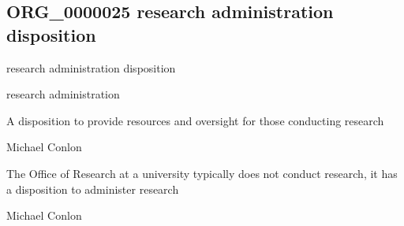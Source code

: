 \documentclass[letterpaper,10pt,english]{sphinxmanual}
\begin{document}
\subsection{ORG\_0000025 \sphinxhyphen{} research administration disposition}
\label{\detokenize{doc-ORG_0000025:org-0000025-research-administration-disposition}}\label{\detokenize{doc-ORG_0000025:index-0}}\label{\detokenize{doc-ORG_0000025::doc}}
\begin{sphinxShadowBox}

\sphinxAtStartPar
research administration disposition
\end{sphinxShadowBox}

\begin{sphinxShadowBox}

\sphinxAtStartPar
research administration
\end{sphinxShadowBox}

\begin{sphinxShadowBox}

\sphinxAtStartPar
{\hyperref[\detokenize{doc-BFO_0000016::doc}]{}}
\end{sphinxShadowBox}

\begin{sphinxShadowBox}

\sphinxAtStartPar
A disposition to provide resources and oversight for those conducting research
\end{sphinxShadowBox}

\begin{sphinxShadowBox}

\sphinxAtStartPar
Michael Conlon 
\end{sphinxShadowBox}

\begin{sphinxShadowBox}

\sphinxAtStartPar
The Office of Research at a university typically does not conduct research, it has a disposition to administer research
\end{sphinxShadowBox}

\begin{sphinxShadowBox}

\sphinxAtStartPar
Michael Conlon 
\end{sphinxShadowBox}
\begin{quote}

\ignorespaces \end{quote}
\end{document}
